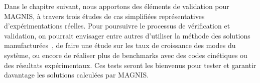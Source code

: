 \begin{refsection}
Dans le chapitre suivant, nous apportons des éléments de validation pour
MAGNIS, à travers trois études de cas simplifiées représentatives
d'expérimentations réelles. Pour poursuivre le processus de vérification et
validation, on pourrait envisager entre autres d'utiliser la méthode des
solutions manufacturées~\parencite{Roy}, de faire une étude sur les taux de
croissance des modes du système, ou encore de réaliser plus de benchmarks avec
des codes cinétiques ou des résultats expérimentaux.
Ces tests seront les bienvenus pour tester et garantir davantage les solutions calculées par MAGNIS. 

%
%
\end{refsection}


